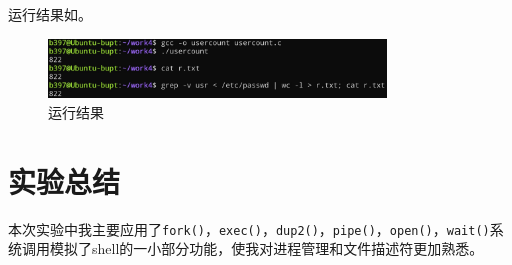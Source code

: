 \documentclass[lang=cn,11pt,a4paper,cite=authornum]{paper}
\begin{document}
运行结果如。

\begin{figure}[!htb]
    \centering
    \includegraphics[width=0.8\textwidth]{./images/l4.jpg}
    \caption{运行结果\label{fig:p1}}
\end{figure}

\section{实验总结}

本次实验中我主要应用了\texttt{fork()}，\texttt{exec()}，\texttt{dup2()}，\texttt{pipe()}，\texttt{open()}，\texttt{wait()}系统调用模拟了shell的一小部分功能，使我对进程管理和文件描述符更加熟悉。
\end{document}
